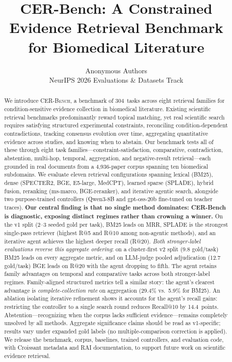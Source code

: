 \documentclass{article}
\title{CER-Bench: A Constrained Evidence Retrieval Benchmark\\ for Biomedical Literature}
\author{
  Anonymous Authors\\
  NeurIPS 2026 Evaluations \& Datasets Track
}
\begin{document}
\maketitle

\begin{abstract}
We introduce \textsc{CER-Bench}, a benchmark of 304~tasks across eight retrieval families for condition-sensitive evidence collection in biomedical literature. Existing scientific retrieval benchmarks predominantly reward topical matching, yet real scientific search requires satisfying structured experimental constraints, reconciling condition-dependent contradictions, tracking consensus evolution over time, aggregating quantitative evidence across studies, and knowing when to abstain. Our benchmark tests all of these through eight task families---constraint-satisfaction, comparative, contradiction, abstention, multi-hop, temporal, aggregation, and negative-result retrieval---each grounded in real documents from a 4,936-paper corpus spanning ten biomedical subdomains. We evaluate eleven retrieval configurations spanning lexical (BM25), dense (SPECTER2, BGE, E5-large, MedCPT), learned sparse (SPLADE), hybrid fusion, reranking (ms-marco, BGE-reranker), and iterative agentic search, alongside two purpose-trained controllers (Qwen3-8B and gpt-oss-20b fine-tuned on teacher traces). \textbf{Our central finding is that no single method dominates: CER-Bench is diagnostic, exposing distinct regimes rather than crowning a winner.} On the v1 split (2--3 seeded gold per task), BM25 leads on MRR, SPLADE is the strongest single-pass retriever (highest R@5 and R@10 among non-agentic methods), and an iterative agent achieves the highest deeper recall (R@20). \emph{Both stronger-label evaluations reverse this aggregate ordering}: on a cluster-first v2 split (9.8 gold/task) BM25 leads on every aggregate metric, and on LLM-judge pooled adjudication (12.7 gold/task) BGE leads on R@20 with the agent dropping to fifth. The agent retains family advantages on temporal and comparative tasks across both stronger-label regimes. Family-aligned structured metrics tell a similar story: the agent's clearest advantage is \emph{complete-collection rate} on aggregation (29.4\% vs.\ 5.9\% for BM25). An ablation isolating iterative refinement shows it accounts for the agent's recall gains: restricting the controller to a single search round reduces Recall@10 by 14.4~points. Abstention---recognizing when the corpus lacks sufficient evidence---remains completely unsolved by all methods. Aggregate significance claims should be read as v1-specific; results vary under expanded gold labels (no multiple-comparison correction is applied). We release the benchmark, corpus, baselines, trained controllers, and evaluation code, with Croissant metadata and RAI documentation, to support future work on scientific evidence retrieval.
\end{abstract}
\end{document}
